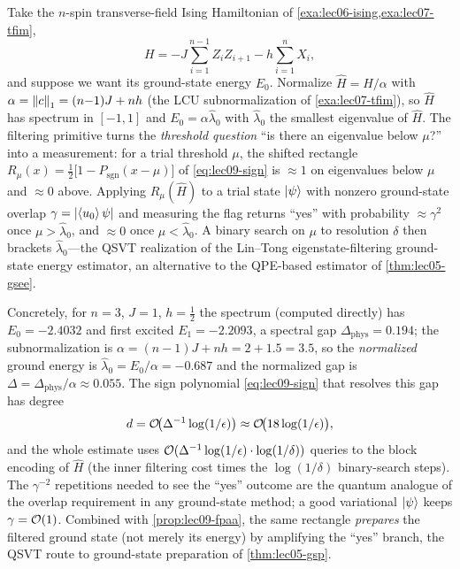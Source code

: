 \begin{example}
\label{exa:lec09-ising}
Take the $n$-spin transverse-field Ising Hamiltonian of
\cref{exa:lec06-ising,exa:lec07-tfim},
\[
  H=-J\sum_{i=1}^{n-1}Z_iZ_{i+1}-h\sum_{i=1}^{n}X_i,
\]
and suppose we want its ground-state energy $E_0$. Normalize $\hat H=H/\alpha$ with
$\alpha=\left\lVert c \right\rVert_1=(n{-}1)J+nh$ (the LCU subnormalization of \cref{exa:lec07-tfim}), so
$\hat H$ has spectrum in $[-1,1]$ and $E_0=\alpha\hat\lambda_0$ with
$\hat\lambda_0$ the smallest eigenvalue of $\hat H$. The filtering primitive turns the
\emph{threshold question} ``is there an eigenvalue below $\mu$?'' into a measurement:
for a trial threshold $\mu$, the shifted rectangle
$R_\mu(x)=\tfrac12\bigl[1-P_{\mathrm{sgn}}(x-\mu)\bigr]$ of \eqref{eq:lec09-sign} is
$\approx1$ on eigenvalues below $\mu$ and $\approx0$ above. Applying $R_\mu(\hat H)$ to a
trial state $\ket\psi$ with nonzero ground-state overlap
$\gamma=\left\lvert \braket{u_0}{\psi} \right\rvert$ and measuring the flag returns ``yes'' with
probability $\approx\gamma^2$ once $\mu>\hat\lambda_0$, and $\approx0$ once
$\mu<\hat\lambda_0$. A binary search on $\mu$ to resolution $\delta$ then brackets
$\hat\lambda_0$---the QSVT realization of the Lin--Tong eigenstate-filtering ground-state
energy estimator, an alternative to the QPE-based estimator of \cref{thm:lec05-gsee}.

Concretely, for $n=3$, $J=1$, $h=\tfrac12$ the spectrum (computed directly) has
$E_0=-2.4032$ and first excited $E_1=-2.2093$, a spectral gap
$\Delta_{\mathrm{phys}}=0.194$; the subnormalization is $\alpha=(n{-}1)J+nh=2+1.5=3.5$,
so the \emph{normalized} ground energy is $\hat\lambda_0=E_0/\alpha=-0.687$ and the
normalized gap is $\Delta=\Delta_{\mathrm{phys}}/\alpha\approx0.055$. The sign
polynomial \eqref{eq:lec09-sign} that resolves this gap has degree
\[
  d=\mathcal{O}\!\bigl(\Delta^{-1}\log(1/\epsilon)\bigr)\approx\mathcal{O}\!\bigl(18\log(1/\epsilon)\bigr),
\]
and the whole estimate uses $\mathcal{O}(\Delta^{-1}\log(1/\epsilon)\cdot\log(1/\delta))$ queries
to the block encoding of $\hat H$ (the inner filtering cost times the
$\log(1/\delta)$ binary-search steps). The $\gamma^{-2}$ repetitions needed to see the
``yes'' outcome are the quantum analogue of the overlap requirement in any
ground-state method; a good variational $\ket\psi$ keeps $\gamma=\mathcal{O}(1)$. Combined
with \cref{prop:lec09-fpaa}, the same rectangle \emph{prepares} the filtered ground
state (not merely its energy) by amplifying the ``yes'' branch, the QSVT route to
ground-state preparation of \cref{thm:lec05-gsp}.


\end{example}
